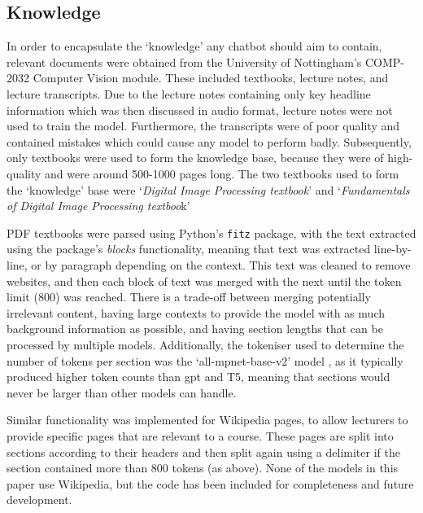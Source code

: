 \subsection{Knowledge}\label{sec:methodology_knowledge}
In order to encapsulate the `knowledge' any chatbot should aim to contain, relevant documents were obtained from the University of Nottingham's COMP-2032 Computer Vision module. These included textbooks, lecture notes, and lecture transcripts. Due to the lecture notes containing only key headline information which was then discussed in audio format, lecture notes were not used to train the model. Furthermore, the transcripts were of poor quality and contained mistakes which could cause any model to perform badly. Subsequently, only textbooks were used to form the knowledge base, because they were of high-quality and were around 500-1000 pages long. The two textbooks used to form the `knowledge' base were `\textit{Digital Image Processing textbook}' \citep{gonzalez2018digital} and `\textit{Fundamentals of Digital Image Processing textboo}k' \citep{solomon2010fundamentals}

PDF textbooks were parsed using Python's \texttt{fitz} package, with the text extracted using the package's \textit{blocks} functionality, meaning that text was extracted line-by-line, or by paragraph depending on the context. This text was cleaned to remove websites, and then each block of text was merged with the next until the token limit (800) was reached. There is a trade-off between merging potentially irrelevant content, having large contexts to provide the model with as much background information as possible, and having section lengths that can be processed by multiple models. Additionally, the tokeniser used to determine the number of tokens per section was the `all-mpnet-base-v2' model \citep{huggingface_tokeniser_model}, as it typically produced higher token counts than \acrshort{gpt} and T5, meaning that sections would never be larger than other models can handle.

Similar functionality was implemented for Wikipedia pages, to allow lecturers to provide specific pages that are relevant to a course. These pages are split into sections according to their headers and then split again using a delimiter if the section contained more than 800 tokens (as above). None of the models in this paper use Wikipedia, but the code has been included for completeness and future development.

